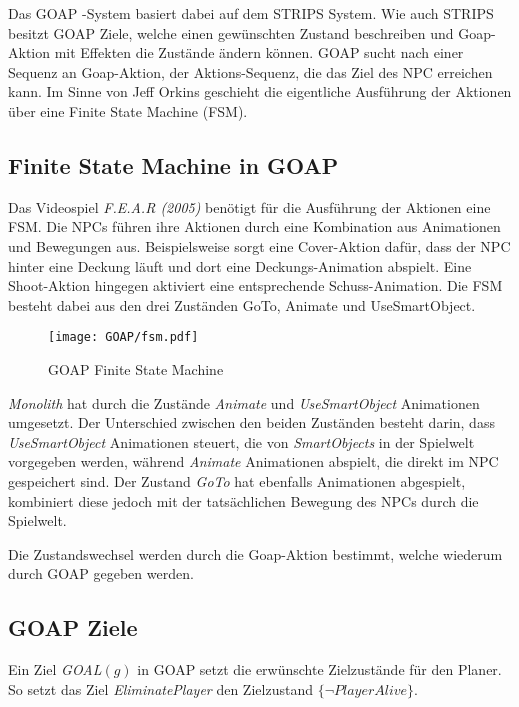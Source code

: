 Das GOAP -System basiert dabei auf dem STRIPS System. Wie auch STRIPS besitzt GOAP Ziele, welche einen gew\"{u}nschten Zustand beschreiben und Goap-Aktion mit Effekten die Zust\"{a}nde \"{a}ndern k\"{o}nnen. GOAP sucht nach einer Sequenz an Goap-Aktion, der Aktions-Sequenz, die das Ziel des NPC erreichen kann. Im Sinne von Jeff Orkins geschieht die eigentliche Ausf\"{u}hrung der Aktionen \"{u}ber eine Finite State Machine (FSM).\autocite{}


\subsection{Finite State Machine in GOAP}
\label{chap:fsm goap}

Das Videospiel \textit{F.E.A.R (2005)} ben\"{o}tigt f\"{u}r die Ausf\"{u}hrung der Aktionen eine FSM. Die NPCs f\"{u}hren ihre Aktionen durch eine Kombination aus Animationen und Bewegungen aus. Beispielsweise sorgt eine Cover-Aktion daf\"{u}r, dass der NPC hinter eine Deckung l\"{a}uft und dort eine Deckungs-Animation abspielt. Eine Shoot-Aktion hingegen aktiviert eine entsprechende Schuss-Animation. Die FSM besteht dabei aus den drei Zust\"{a}nden GoTo, Animate und UseSmartObject. 
\begin{figure}[h]
  \centering
  \texttt{[image: GOAP/fsm.pdf]}
	\captionsetup{justification=justified, format=plain}
  \caption{GOAP Finite State Machine}
  \label{fig:Goap FSM}
\end{figure}

\textit{Monolith} hat durch die Zust\"{a}nde \textit{Animate} und \textit{UseSmartObject} Animationen umgesetzt. Der Unterschied zwischen den beiden Zust\"{a}nden besteht darin, dass \textit{UseSmartObject} Animationen steuert, die von \textit{SmartObjects} in der Spielwelt vorgegeben werden, w\"{a}hrend \textit{Animate} Animationen abspielt, die direkt im NPC gespeichert sind. Der Zustand \textit{GoTo} hat ebenfalls Animationen abgespielt, kombiniert diese jedoch mit der tats\"{a}chlichen Bewegung des NPCs durch die Spielwelt.

Die Zustandswechsel werden durch die Goap-Aktion bestimmt, welche wiederum durch GOAP gegeben werden.


\subsection{GOAP Ziele}
\label{chap:goap ziele}

Ein Ziel \textit{GOAL}$(g)$ in GOAP setzt die erw\"{u}nschte Zielzust\"{a}nde f\"{u}r den Planer. So setzt das Ziel \textit{EliminatePlayer} den Zielzustand $\{\lnot \textit{PlayerAlive}\}$.

